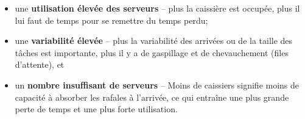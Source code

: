 \begin{itemize}
\item une \textbf{utilisation élevée des serveurs} -- plus la caissière est occupée, plus il lui faut de temps pour se remettre du temps perdu; 
\item une \textbf{variabilit\'e \'elev\'ee} -- plus la variabilité des arrivées ou de la taille des tâches est importante, plus il y a de gaspillage et de chevauchement (files d'attente), et 
\item un \textbf{nombre insuffisant de serveurs} -- Moins de caissiers signifie moins de capacité à absorber les rafales \`a l'arrivée, ce qui entraîne une plus grande perte de temps et une plus forte utilisation.
\end{itemize}